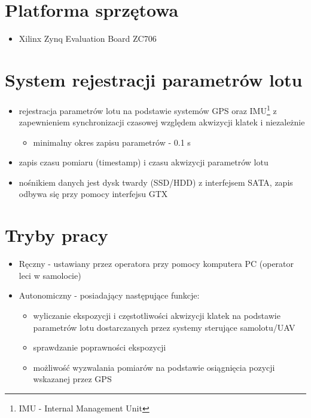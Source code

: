 \documentclass[a4paper,11pt,oneside]{book}  %
\begin{document}
\section{Platforma sprzętowa}
\begin{itemize}
\item Xilinx Zynq Evaluation Board ZC706 \cite{ZC706}
\end{itemize}

\section{System rejestracji parametrów lotu}

\begin{itemize}
\item rejestracja parametrów lotu na podstawie systemów GPS oraz IMU\footnote{IMU - Internal Management Unit} z zapewnieniem synchronizacji czasowej względem akwizycji klatek i niezależnie 
	\begin{itemize}
	\item minimalny okres zapisu parametrów - 0.1 s
	\end{itemize}
\item zapis czasu pomiaru (timestamp) i czasu akwizycji parametrów lotu
\item nośnikiem danych jest dysk twardy 
(SSD/HDD) z interfejsem SATA, zapis odbywa się przy pomocy interfejsu GTX
\end{itemize}



\section{Tryby pracy}

\begin{itemize}
\item Ręczny - ustawiany przez operatora przy pomocy komputera PC (operator leci w samolocie)
\item Autonomiczny - posiadający następujące funkcje: 
	\begin{itemize}
		\item wyliczanie ekspozycji i częstotliwości akwizycji klatek na podstawie parametrów lotu dostarczanych przez systemy sterujące samolotu/UAV
		\item sprawdzanie poprawności ekspozycji
		\item możliwość wyzwalania pomiarów na podstawie osiągnięcia pozycji wskazanej przez GPS
	\end{itemize}
	
\end{itemize}
\end{document}
